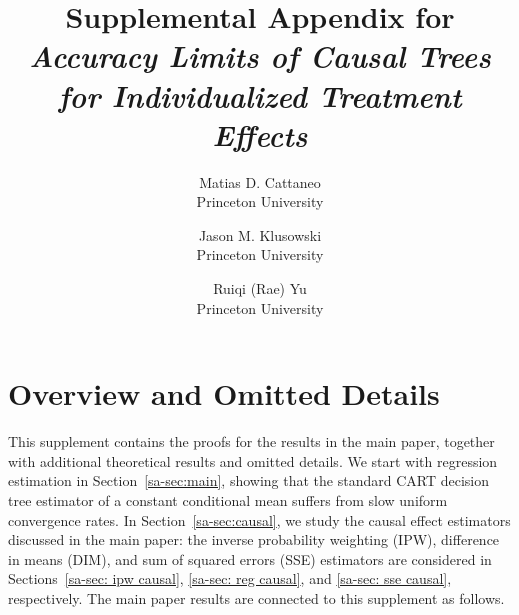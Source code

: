 \documentclass[10pt]{article}
\title{Supplemental Appendix for\\
\emph{Accuracy Limits of Causal Trees for Individualized Treatment Effects}}
\author{Matias D. Cattaneo\\[0.35em] Princeton University \and
        Jason M. Klusowski\\[0.35em] Princeton University \and
        Ruiqi (Rae) Yu\\[0.35em] Princeton University}
\theoremstyle{definition}
\theoremstyle{remark}
\begin{document}
\maketitle

\setlength{\cftsecnumwidth}{3.6em}
\setlength{\cftsubsecnumwidth}{4.4em}
\setlength{\cftsubsubsecnumwidth}{5.2em}
\tableofcontents

\clearpage

\setcounter{section}{0}
\setcounter{subsection}{0}
\setcounter{subsubsection}{0}
\setcounter{equation}{0}
\setcounter{theorem}{0}
\setcounter{definition}{0}
\setcounter{assumption}{0}
\renewcommand{\thesection}{SA-\arabic{section}}
\renewcommand{\thesubsection}{\thesection.\arabic{subsection}}
\renewcommand{\thesubsubsection}{\thesubsection.\arabic{subsubsection}}
\renewcommand{\theequation}{SA-\arabic{equation}}
\renewcommand{\thetheorem}{SA-\arabic{theorem}}
\renewcommand{\thelemma}{\thetheorem}
\renewcommand{\thecoro}{\thetheorem}
\renewcommand{\thedefinition}{SA-\arabic{definition}}
\renewcommand{\theassumption}{SA-\arabic{assumption}}

\section{Overview and Omitted Details}\label{sec:overview}

This supplement contains the proofs for the results in the main paper, together with additional theoretical results and omitted details. We start with regression estimation in Section~\ref{sa-sec:main}, showing that the standard CART decision tree estimator of a constant conditional mean suffers from slow uniform convergence rates. In Section~\ref{sa-sec:causal}, we study the causal effect estimators discussed in the main paper: the inverse probability weighting (IPW), difference in means (DIM), and sum of squared errors (SSE) estimators are considered in Sections~\ref{sa-sec: ipw causal}, \ref{sa-sec: reg causal}, and \ref{sa-sec: sse causal}, respectively. The main paper results are connected to this supplement as follows.
\end{document}
